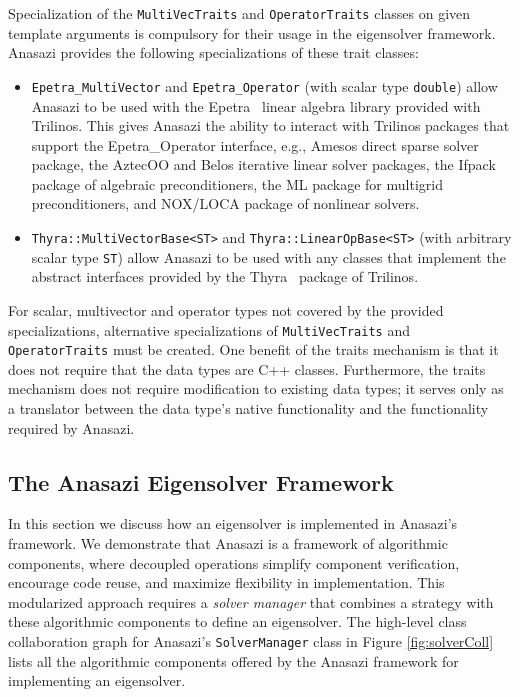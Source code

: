 \documentclass[acmtoms]{acmtrans2m}
\newcounter{algorithm}
\newcommand{\aspace}[1]{\texttt{#1}}
\begin{document}
Specialization of the \aspace{MultiVecTraits} and \aspace{OperatorTraits} classes on
given template arguments is compulsory for their usage in the eigensolver framework.
Anasazi provides the following specializations of these trait classes:
\begin{itemize}
  \item \aspace{Epetra\_MultiVector} and \aspace{Epetra\_Operator} (with scalar type
    \aspace{double}) allow Anasazi to be used with the Epetra~\cite{Trilinos:Epetra} linear
    algebra library provided with Trilinos. This gives Anasazi the ability to interact with 
    Trilinos packages that support the Epetra\_Operator interface, e.g., Amesos direct
    sparse solver package, the AztecOO and Belos iterative linear solver packages, 
    the Ifpack package of algebraic preconditioners, the ML package for multigrid
    preconditioners, and NOX/LOCA package of nonlinear solvers. 
  \item \aspace{Thyra::MultiVectorBase<ST>} and
    \aspace{Thyra::LinearOpBase<ST>} (with arbitrary scalar type
    \aspace{ST}) allow Anasazi to be used with any classes that implement the abstract interfaces
    provided by the Thyra~\cite{Trilinos:Thyra} package of Trilinos.
\end{itemize}
For scalar, multivector and operator types not covered by the provided specializations,
alternative specializations of \aspace{MultiVecTraits} and \aspace{OperatorTraits}
must be created. One benefit of the traits mechanism is that it does
not require that the data types are C++ classes. Furthermore, the traits mechanism
does not require modification to existing data types; it serves only as a translator between
the data type's native functionality and the functionality required by Anasazi.


\subsection{The Anasazi Eigensolver Framework}
\label{subsec:anasazi:solver_framework}

In this section we discuss how an eigensolver is implemented in Anasazi's framework. We
demonstrate that Anasazi is a framework of algorithmic components, where decoupled
operations simplify component verification, encourage code reuse, and maximize flexibility
in implementation. This modularized approach requires a \emph{solver manager} that
combines a strategy with these algorithmic components to define an eigensolver.  The
high-level class collaboration graph for Anasazi's \aspace{SolverManager} class in Figure
\ref{fig:solverColl} lists all the algorithmic components offered by the Anasazi framework
for implementing an eigensolver.
\end{document}
